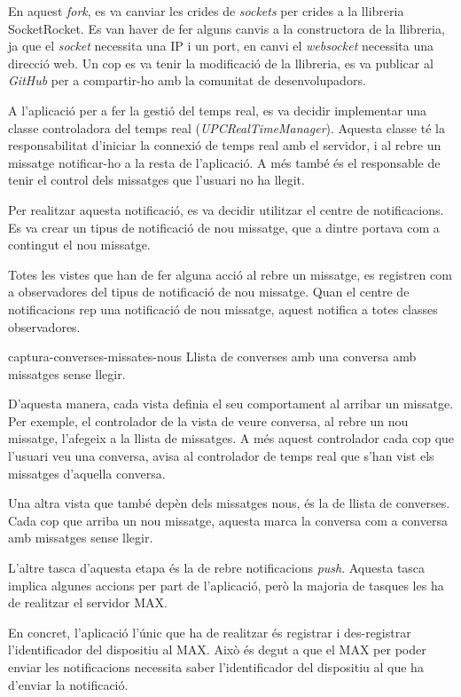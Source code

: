 En aquest \textit{fork}, es va canviar les crides de \textit{sockets} per crides a la llibreria SocketRocket. Es van haver de fer alguns canvis a la constructora de la llibreria, ja que el \textit{socket} necessita una IP i un port, en canvi el \textit{websocket} necessita una direcció web. Un cop es va tenir la modificació de la llibreria, es va publicar al \textit{GitHub} per a compartir-ho amb la comunitat de desenvolupadors.

A l'aplicació per a fer la gestió del temps real, es va decidir implementar una classe controladora del temps real (\textit{UPCRealTimeManager}). Aquesta classe té la responsabilitat d'iniciar la connexió de temps real amb el servidor, i al rebre un missatge notificar-ho a la resta de l'aplicació. A més també és el responsable de tenir el control dels missatges que l'usuari no ha llegit.

Per realitzar aquesta notificació, es va decidir utilitzar el centre de notificacions. Es va crear un tipus de notificació de nou missatge, que a dintre portava com a contingut el nou missatge. 

Totes les vistes que han de fer alguna acció al rebre un missatge, es registren com a observadores del tipus de notificació de nou missatge. Quan el centre de notificacions rep una notificació de nou missatge, aquest notifica a totes classes observadores.


\pintaUnaImatge
    {captura-converses-missates-nous}
    {Llista de converses amb una conversa amb missatges sense llegir.}


D'aquesta manera, cada vista definia el seu comportament al arribar un missatge. Per exemple, el controlador de la vista de veure conversa, al rebre un nou missatge, l'afegeix a la llista de missatges. A més aquest controlador cada cop que l'usuari veu una conversa, avisa al controlador de temps real que s'han vist els missatges d'aquella conversa.

Una altra vista que també depèn dels missatges nous, és la de llista de converses. Cada cop que arriba un nou missatge, aquesta marca la conversa com a conversa amb missatges sense llegir.

L'altre tasca d'aquesta etapa és la de rebre notificacions \textit{push}. Aquesta tasca implica algunes accions per part de l'aplicació, però la majoria de tasques les ha de realitzar el servidor MAX.

En concret, l'aplicació l'únic que ha de realitzar és registrar i des-registrar l'identificador del dispositiu al MAX. Això és degut a que el MAX per poder enviar les notificacions necessita saber l'identificador del dispositiu al que ha d'enviar la notificació.

